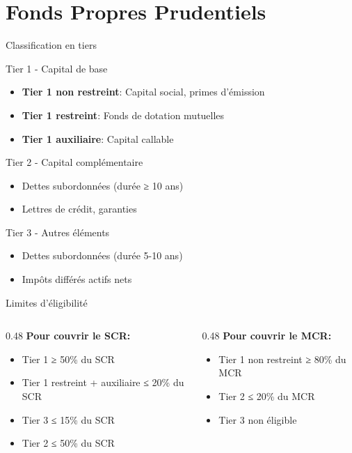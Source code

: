 \documentclass[10pt,aspectratio=169]{beamer}
\begin{document}
\section{Fonds Propres Prudentiels}
\begin{frame}{Classification en tiers}
\begin{block}{Tier 1 - Capital de base}
\begin{itemize}
\item \textbf{Tier 1 non restreint}: Capital social, primes d'émission
\item \textbf{Tier 1 restreint}: Fonds de dotation mutuelles
\item \textbf{Tier 1 auxiliaire}: Capital callable
\end{itemize}
\end{block}

\begin{block}{Tier 2 - Capital complémentaire}
\begin{itemize}
\item Dettes subordonnées (durée ≥ 10 ans)
\item Lettres de crédit, garanties
\end{itemize}
\end{block}

\begin{block}{Tier 3 - Autres éléments}
\begin{itemize}
\item Dettes subordonnées (durée 5-10 ans)
\item Impôts différés actifs nets
\end{itemize}
\end{block}
\end{frame}

\begin{frame}{Limites d'éligibilité}
\begin{columns}[T]
\begin{column}{0.48\textwidth}
\textbf{Pour couvrir le SCR:}
\begin{itemize}
\item Tier 1 ≥ 50\% du SCR
\item Tier 1 restreint + auxiliaire ≤ 20\% du SCR
\item Tier 3 ≤ 15\% du SCR
\item Tier 2 ≤ 50\% du SCR
\end{itemize}
\end{column}
\begin{column}{0.48\textwidth}
\textbf{Pour couvrir le MCR:}
\begin{itemize}
\item Tier 1 non restreint ≥ 80\% du MCR
\item Tier 2 ≤ 20\% du MCR
\item Tier 3 non éligible
\end{itemize}
\end{column}
\end{columns}
\end{frame}
\end{document}
